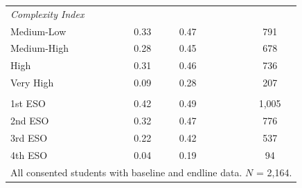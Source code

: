 \begin{center}
{\begin{tabular}{@{}lccccc@{}}
  \multicolumn{6}{l}{\textit{Complexity Index}} \\                                                                                    
  \hspace{1.5em}Medium-Low & 0.33 & 0.47 &  &  & 791 \\                                                                               
  \hspace{1.5em}Medium-High & 0.28 & 0.45 &  &  & 678 \\
  \hspace{1.5em}High & 0.31 & 0.46 &  &  & 736 \\                                                                                     
  \hspace{1.5em}Very High & 0.09 & 0.28 &  &  & 207 \\
  \addlinespace[1pt]                                                                                                                  
  \multicolumn{6}{l}{\textit{ESO Level}} \\
  \hspace{1.5em}1st ESO & 0.42 & 0.49 &  &  & 1,005 \\                                                                                
  \hspace{1.5em}2nd ESO & 0.32 & 0.47 &  &  & 776 \\                                                                                  
  \hspace{1.5em}3rd ESO & 0.22 & 0.42 &  &  & 537 \\
  \hspace{1.5em}4th ESO & 0.04 & 0.19 &  &  & 94 \\                                                                                   
  \midrule                                                                                                                            
  \multicolumn{6}{l}{\tiny All consented students with baseline and endline data. $N$ = 2,164.} \\                                    
  \bottomrule                                                                                                                         
  \end{tabular}                          
  }%
  \end{center}   